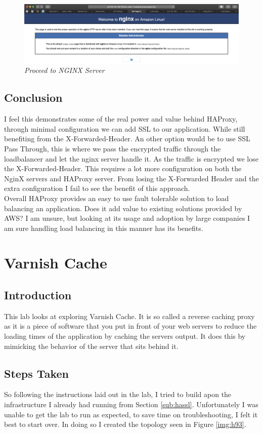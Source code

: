 \begin{figure}[!hb]
\centering
\includegraphics*[width=1\textwidth]{images/h4.png}
\caption{\em Proceed to NGINX Server}
\label{img:h4}
\end{figure}

\subsection{Conclusion}
I feel this demonstrates some of the real power and value behind HAProxy, through minimal configuration we can add SSL to our application. While still benefiting from the X-Forwarded-Header. An other option would be to use SSL Pass Through, this is where we pass the encrypted traffic through the loadbalancer and let the nginx server handle it. As the traffic is encrypted we lose the X-Forwarded-Header. This requires a lot more configuration on both the NginX servers and HAProxy server. From losing the X-Forwarded Header and the extra configuration I fail to see the benefit of this approach.
\\Overall HAProxy provides an easy to use fault tolerable solution to load balancing an application. Does it add value to existing solutions provided by AWS? I am unsure, but looking at its usage and adoption by large companies I am sure handling load balancing in this manner has its benefits.

\section{Varnish Cache}
\subsection{Introduction}
This lab looks at exploring Varnish Cache. It is so called a reverse caching proxy as it is a piece of software that you put in front of your web servers to reduce the loading times of the application by caching the servers output. It does this by mimicking the behavior of the server that sits behind it.

\subsection{Steps Taken}
So following the instructions laid out in the lab, I tried to build apon the infrastructure I already had running from Section \ref{sub:hassl}. Unfortunately I was unable to get the lab to run as expected, to save time on troubleshooting, I felt it best to start over. In doing so I created the topology seen in Figure \ref{img:h93}.

